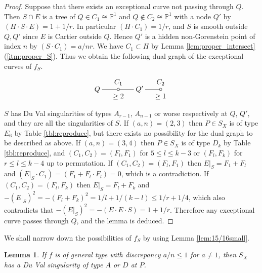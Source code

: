 \documentclass[a4paper,11pt]{amsart}
\newtheorem{lemma}[theorem]{Lemma}
\theoremstyle{definition}
\theoremstyle{remark}
\numberwithin{equation}{section}
\newcommand{\bP}{{\mathbb P}}
\begin{document}
\begin{proof}
Suppose that there exists an exceptional curve not passing through $Q$.
Then $S \cap E$ is a tree of
$Q \in C_1 \cong \bP^1$ and $Q \not\in C_2 \cong \bP^1$ with a node $Q'$
by $(H \cdot S \cdot E)=1+1/r$.
In particular $(H \cdot C_1)=1/r$,
and $S$ is smooth outside $Q,Q'$ since $E$ is Cartier outside $Q$.
Hence $Q'$ is a hidden non-Gorenstein point of index $n$
by $(S \cdot C_1)=a/nr$.
We have $C_1 \subset H$
by Lemma \ref{lem:proper_intersect}(\ref{itm:proper_S}).
Thus we obtain the following dual graph of
the exceptional curves of $f_S$.
\begin{align*}
\xymatrix@!0@=30pt{
Q \ar@{-}[r]_>*+{\ \ge2}^>*+{\ C_1} &
*=<3.5pt>{\circ} \ar@{-}[r] &
Q' \ar@{-}[r]_>*+{\ \ge1}^>*+{\ C_2} &
*=<3.5pt>{\circ}
}
\end{align*}
$S$ has Du Val singularities of types $A_{r-1}$, $A_{n-1}$ or worse
respectively at $Q$, $Q'$,
and they are all the singularities of $S$.
If $(a,n)=(2,3)$ then
$P \in S_X$ is of type $E_6$ by Table \ref{tbl:reproduce},
but there exists no possibility for the dual graph to be described as above.
If $(a,n)=(3,4)$ then
$P \in S_X$ is of type $D_k$ by Table \ref{tbl:reproduce},
and $(C_1,C_2)=(F_l,F_1)$ for $5 \le l\le k-3$
or $(F_l,F_k)$ for $r \le l \le k-4$ up to permutation.
If $(C_1,C_2)=(F_l,F_1)$ then $E|_S=F_1+F_l$ and
$(E|_S \cdot C_1)=(F_1+F_l \cdot F_l)=0$,
which is a contradiction.
If $(C_1,C_2)=(F_l,F_k)$
then $E|_S=F_l+F_k$ and $-(E|_S)^2=-(F_l+F_k)^2=1/l+1/(k-l)\le1/r+1/4$,
which also contradicts that $-(E|_S)^2=-(E \cdot E \cdot S)=1+1/r$.
Therefore any exceptional curve passes through $Q$,
and the lemma is deduced.
\end{proof}

We shall narrow down the possibilities of $f_S$
by using Lemma \ref{lem:15/16small}.

\begin{lemma}\label{lem:15/16small_non-E}
If $f$ is of general type with discrepancy $a/n\le1$ for $a\neq1$,
then $S_X$ has a Du Val singularity of type $A$ or $D$ at $P$.
\end{lemma}
\end{document}
